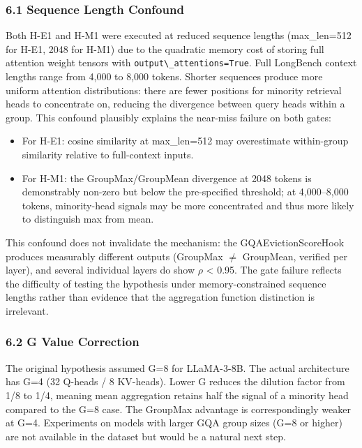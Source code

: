 
\subsubsection{6.1 Sequence Length Confound}

Both H-E1 and H-M1 were executed at reduced sequence lengths (max\_len=512 for H-E1, 2048 for H-M1) due to the quadratic memory cost of storing full attention weight tensors with \texttt{output\textbackslash \_attentions=True}. Full LongBench context lengths range from 4,000 to 8,000 tokens. Shorter sequences produce more uniform attention distributions: there are fewer positions for minority retrieval heads to concentrate on, reducing the divergence between query heads within a group. This confound plausibly explains the near-miss failure on both gates:

\begin{itemize}
\item For H-E1: cosine similarity at max\_len=512 may overestimate within-group similarity relative to full-context inputs.
\item For H-M1: the GroupMax/GroupMean divergence at 2048 tokens is demonstrably non-zero but below the pre-specified threshold; at 4,000--8,000 tokens, minority-head signals may be more concentrated and thus more likely to distinguish max from mean.
\end{itemize}

This confound does not invalidate the mechanism: the GQAEvictionScoreHook produces measurably different outputs (GroupMax $\neq$ GroupMean, verified per layer), and several individual layers do show $\rho$ < 0.95. The gate failure reflects the difficulty of testing the hypothesis under memory-constrained sequence lengths rather than evidence that the aggregation function distinction is irrelevant.

\subsubsection{6.2 G Value Correction}

The original hypothesis assumed G=8 for LLaMA-3-8B. The actual architecture has G=4 (32 Q-heads / 8 KV-heads). Lower G reduces the dilution factor from 1/8 to 1/4, meaning mean aggregation retains half the signal of a minority head compared to the G=8 case. The GroupMax advantage is correspondingly weaker at G=4. Experiments on models with larger GQA group sizes (G=8 or higher) are not available in the dataset but would be a natural next step.

